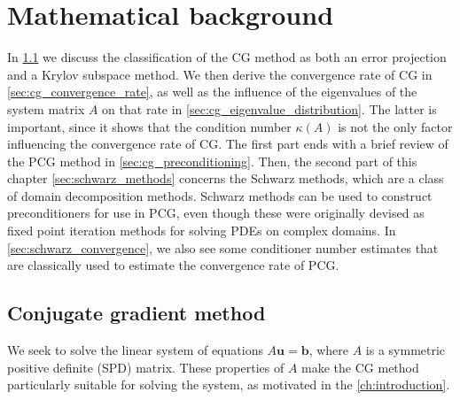 \chapter{Mathematical background}\label{ch:background}
In \cref{sec:cg_method} we discuss the classification of the CG method as both an error projection and a Krylov subspace method. We then derive the convergence rate of CG in \cref{sec:cg_convergence_rate}, as well as the influence of the eigenvalues of the system matrix $A$ on that rate in \cref{sec:cg_eigenvalue_distribution}. The latter is important, since it shows that the condition number $\kappa(A)$ is not the only factor influencing the convergence rate of CG. The first part ends with a brief review of the PCG method in \cref{sec:cg_preconditioning}. Then, the second part of this chapter \cref{sec:schwarz_methods} concerns the Schwarz methods, which are a class of domain decomposition methods. Schwarz methods can be used to construct preconditioners for use in PCG, even though these were originally devised as fixed point iteration methods for solving PDEs on complex domains. In \cref{sec:schwarz_convergence}, we also see some conditioner number estimates that are classically used to estimate the convergence rate of PCG.

\section{Conjugate gradient method}\label{sec:cg_method}
We seek to solve the linear system of equations $A\mathbf{u} = \mathbf{b}$, where $A$ is a symmetric positive definite (SPD) matrix. These properties of $A$ make the CG method particularly suitable for solving the system, as motivated in the \cref{ch:introduction}.

